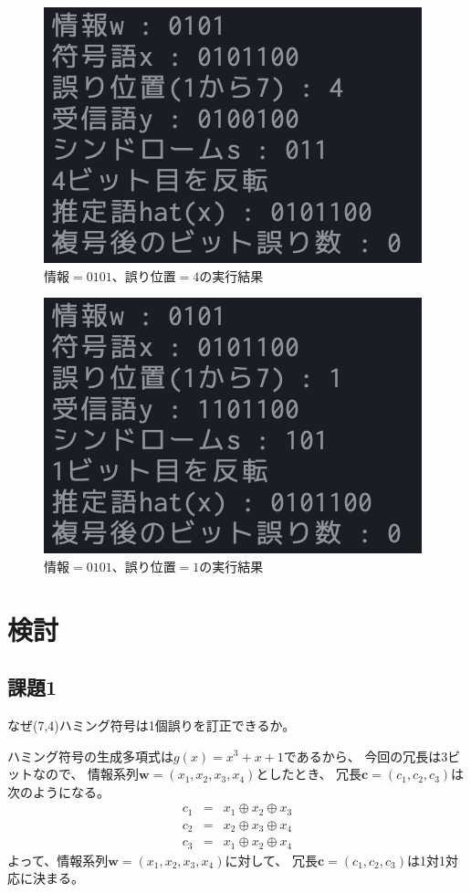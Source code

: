 \documentclass[12pt]{jarticle}
\begin{document}
\begin{figure}[h]
    \begin{center}
        \includegraphics[scale=0.8]{kadai3_2_1.png}
    \end{center}
    \caption{$情報=0101$、$誤り位置=4$の実行結果}
\end{figure}
\clearpage
\begin{figure}[h]
    \begin{center}
        \includegraphics[scale=0.8]{kadai3_2_2.png}
    \end{center}
    \caption{$情報=0101$、$誤り位置=1$の実行結果}
\end{figure}

\section{検討}
\subsection{課題1}
\begin{shadebox}
    なぜ(7,4)ハミング符号は1個誤りを訂正できるか。
\end{shadebox}
ハミング符号の生成多項式は$g(x)=x^3+x+1$であるから、
今回の冗長は3ビットなので、
情報系列$\boldsymbol{w}=(x_1,x_2,x_3,x_4)$としたとき、
冗長$\boldsymbol{c}=(c_1,c_2,c_3)$は次のようになる。
\begin{eqnarray}
    c_1&=&x_1 \oplus x_2 \oplus x_3 \nonumber\\
    c_2&=&x_2 \oplus x_3 \oplus x_4 \nonumber\\
    c_3&=&x_1 \oplus x_2 \oplus x_4 \nonumber
\end{eqnarray}
よって、情報系列$\boldsymbol{w}=(x_1,x_2,x_3,x_4)$に対して、
冗長$\boldsymbol{c}=(c_1,c_2,c_3)$は1対1対応に決まる。
\end{document}
